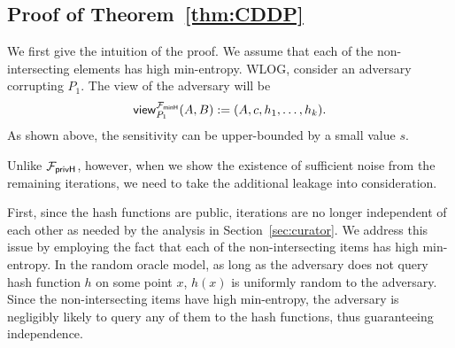 \subsection{Proof of Theorem~\ref{thm:CDDP}}
We first give the intuition of the proof. We assume that each of the non-intersecting elements has high min-entropy. 
WLOG, consider an adversary corrupting $P_1$.
The view of the adversary will be 
  \[\mathsf{view}^{{\mathcal{F}_\mathsf{minH}}}_{P_1}(A, B) := (A,c, h_1, \ldots, h_k). \]
%
As shown above, the sensitivity can be upper-bounded by a small value $s$. 

Unlike ${\mathcal{F}_\mathsf{privH}}$, however, when we show the existence of sufficient noise from the remaining iterations, we need to take the additional leakage into consideration. 

First, since the hash functions are public, iterations are no longer independent of each other as needed by the analysis in Section~\ref{sec:curator}. We address this issue by employing the fact that each of the non-intersecting items has high min-entropy. In the random oracle model, as long as the adversary does not query hash function $h$ on some point $x$, $h(x)$ is uniformly random to the adversary.  Since the non-intersecting items have high min-entropy, the adversary is negligibly likely to query any of them to the hash functions, thus guaranteeing independence.  


